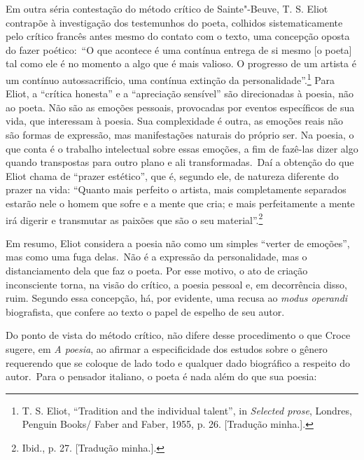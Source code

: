Em outra séria contestação do método crítico de Sainte"-Beuve, T. S. Eliot contrapõe à investigação dos testemunhos do poeta, colhidos
sistematicamente pelo crítico francês antes mesmo do contato com o
texto, uma concepção oposta do fazer poético:~``O que acontece é uma contínua entrega de si mesmo [o poeta] tal como ele é no momento a algo que é mais valioso. O progresso de um artista é um contínuo autossacrifício, uma
contínua extinção da personalidade''.\footnote{T. S. Eliot, ``Tradition
  and the individual talent'', in \emph{Selected prose}, Londres,
  Penguin Books/ Faber and Faber, 1955, p. 26. {[}Tradução minha.{]}.}
Para Eliot, a ``crítica honesta'' e a ``apreciação sensível'' são
direcionadas à poesia, não ao poeta. Não são as emoções pessoais,
provocadas por eventos específicos de sua vida, que interessam à poesia.
Sua complexidade é outra, as emoções reais não são formas de expressão,
mas manifestações naturais do próprio ser. Na poesia, o que conta é o
trabalho intelectual sobre essas emoções, a fim de fazê-las dizer algo
quando transpostas para outro plano e ali transformadas.~Daí a obtenção
do que Eliot chama de ``prazer estético'', que é, segundo ele, de
natureza diferente do prazer na vida: ``Quanto mais perfeito o artista,
mais completamente separados estarão nele o homem que sofre e a mente
que cria; e mais perfeitamente a mente irá digerir e transmutar as
paixões que são o seu material''.\footnote{Ibid., p. 27. {[}Tradução
  minha.{]}.}

Em resumo, Eliot considera a poesia não como um simples ``verter de
emoções'', mas como uma fuga delas.~Não é a expressão da personalidade,
mas o distanciamento dela que faz o poeta. Por esse motivo, o ato de
criação inconsciente torna, na visão do crítico, a poesia pessoal e, em
decorrência disso, ruim. Segundo essa concepção, há, por evidente, uma
recusa ao \emph{modus operandi} biografista, que confere ao texto o
papel de espelho de seu autor.

Do ponto de vista do método crítico, não difere desse procedimento o que
Croce sugere, em \emph{A poesia}, ao afirmar a especificidade dos
estudos sobre o gênero requerendo que se coloque de lado todo e qualquer
dado biográfico a respeito do autor.~Para o pensador italiano, o poeta é
nada além do que sua poesia:

